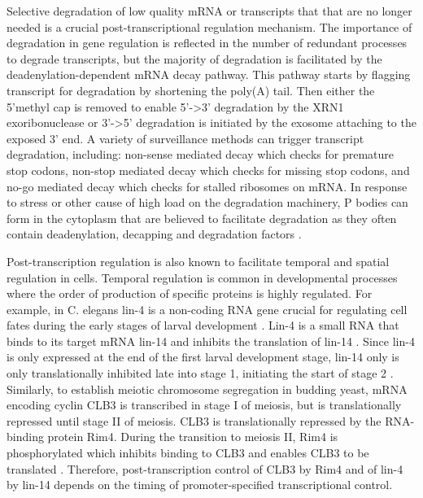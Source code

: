 \documentclass[../main.tex]{subfiles}
\begin{document}
Selective degradation of low quality mRNA or transcripts that that are no longer needed is a crucial post-transcriptional regulation mechanism.
The importance of degradation in gene regulation is reflected in the number of redundant processes to degrade transcripts, but the majority of degradation is facilitated by the deadenylation-dependent mRNA decay pathway.
This pathway starts by flagging transcript for degradation by shortening  the poly(A) tail.
Then either the 5'methyl cap is removed to enable 5'->3' degradation by the XRN1 exoribonuclease or 3'->5' degradation is initiated by the exosome attaching to the exposed 3' end. 
A variety of surveillance methods can trigger transcript degradation, including: non-sense mediated decay which checks for premature stop codons, non-stop mediated decay which checks for missing stop codons, and no-go mediated decay which checks for stalled ribosomes on mRNA.
In response to stress or other cause of high load on the degradation machinery, P bodies can form in the cytoplasm that are believed to facilitate degradation as they often contain deadenylation, decapping and degradation factors \parencite{Garneau2007}.

Post-transcription regulation is also known to facilitate temporal and spatial regulation in cells.  
Temporal regulation is common in developmental processes where the order of production of specific proteins is highly regulated. 
For example, in C. elegans lin-4 is a non-coding RNA gene crucial for regulating cell fates during the early stages of larval development \parencite{Wightman1993}. 
Lin-4 is a small RNA that binds to its target mRNA lin-14 and inhibits the translation of lin-14 \parencite{Lee1993}.
Since lin-4 is only expressed at the end of the first larval development stage, lin-14 only is only translationally inhibited late into stage 1, initiating the start of stage 2 \parencite{Olsen1999}. 
Similarly, to establish meiotic chromosome segregation in budding yeast, mRNA encoding cyclin CLB3 is transcribed in stage I of meiosis, but is translationally repressed until stage II of meiosis. 
CLB3 is translationally repressed by the RNA-binding protein Rim4. 
During the transition to meiosis II, Rim4 is phosphorylated which inhibits binding to CLB3 and enables CLB3 to be translated \parencite{Berchowitz2013}. 
Therefore, post-transcription control of CLB3 by Rim4 and of lin-4 by lin-14 depends on the timing of promoter-specified transcriptional control.
\end{document}
